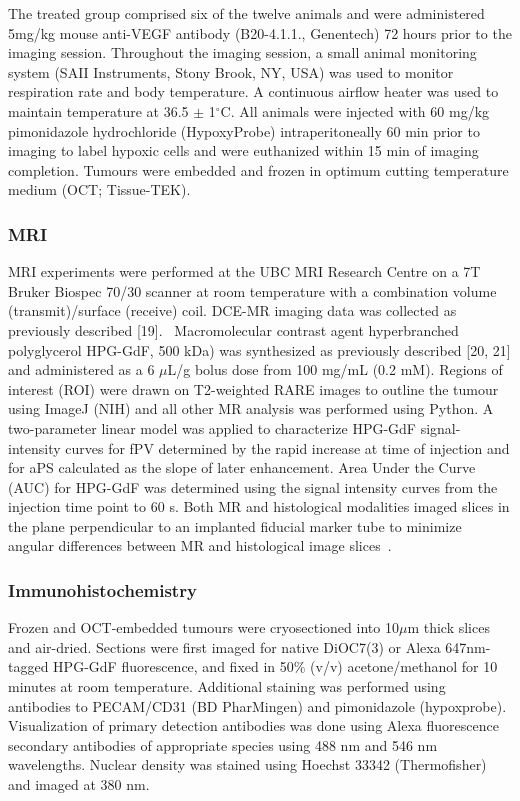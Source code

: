 The treated group comprised six of the twelve animals and were administered 5mg/kg mouse anti-VEGF antibody (B20-4.1.1., Genentech) 72 hours prior to the imaging session.
Throughout the imaging session, a small animal monitoring system (SAII Instruments, Stony Brook, NY, USA) was used to monitor respiration rate and body temperature. 
A continuous airflow heater was used to maintain temperature at 36.5 $\pm$ 1$^\circ$C.
All animals were injected with 60 mg/kg pimonidazole hydrochloride (HypoxyProbe) intraperitoneally 60 min prior to imaging to label hypoxic cells and were euthanized within 15 min of imaging completion.
Tumours were embedded and frozen in optimum cutting temperature medium (OCT; Tissue-TEK).

\subsubsection{MRI}
MRI experiments were performed at the UBC MRI Research Centre on a 7T Bruker Biospec 70/30 scanner at room temperature with a combination volume (transmit)/surface (receive) coil.
DCE-MR imaging data was collected as previously described [19].~
Macromolecular contrast agent hyperbranched polyglycerol \ac{HPG-GdF}, 500 kDa) was synthesized as previously described [20, 21] and administered as a 6 $\mu$L/g bolus dose from 100 mg/mL (0.2 mM).
Regions of interest (ROI) were drawn on T2-weighted RARE images to outline the tumour using ImageJ (NIH) and all other MR analysis was performed using Python.
A two-parameter linear model was applied to characterize \ac{HPG-GdF} signal-intensity curves for \ac{fPV} determined by the rapid increase at time of injection and for \ac{aPS} calculated as the slope of later enhancement.
Area Under the Curve (\ac{AUC}) for \ac{HPG-GdF} was determined using the signal intensity curves from the injection time point to 60 s.
Both MR and histological modalities imaged slices in the plane perpendicular to an implanted fiducial marker tube to minimize angular differences between MR and histological image slices~\cite{Bains:2009hh}.

\subsubsection{Immunohistochemistry}
Frozen and OCT-embedded tumours were cryosectioned into 10$\mu$m thick slices and air-dried.
Sections were first imaged for native DiOC7(3) or Alexa 647nm-tagged \ac{HPG-GdF} fluorescence, and fixed in 50\% (v/v) acetone/methanol for 10 minutes at room temperature.
Additional staining was performed using antibodies to PECAM/CD31 (BD PharMingen) and pimonidazole (hypoxprobe).
Visualization of primary detection antibodies was done using Alexa fluorescence secondary antibodies of appropriate species using 488 nm and 546 nm wavelengths.
Nuclear density was stained using Hoechst 33342 (Thermofisher) and imaged at 380 nm.

